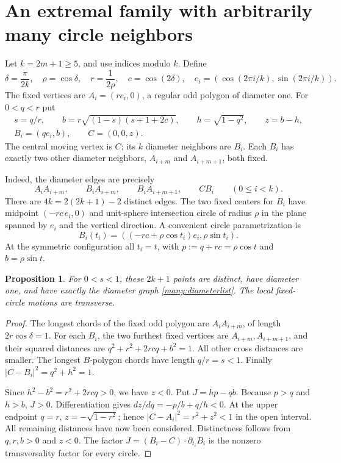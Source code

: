 \documentclass[11pt]{article}
\newtheorem{proposition}[theorem]{Proposition}
\theoremstyle{remark}\newtheorem{remark}[theorem]{Remark}
\begin{document}
\section{An extremal family with arbitrarily many circle neighbors}
Let $k=2m+1\geq5$, and use indices modulo $k$. Define
\[
 \delta=\frac{\pi}{2k},\quad \rho=\cos\delta,\quad
 r=\frac1{2\rho},\quad c=\cos(2\delta),\quad
 e_i=(\cos(2\pi i/k),\sin(2\pi i/k)).
\]
The fixed vertices are $A_i=(re_i,0)$, a regular odd polygon of
diameter one. For $0<q<r$ put
\begin{gather*}
 s=q/r,\qquad b=r\sqrt{(1-s)(s+1+2c)},\qquad
 h=\sqrt{1-q^2},\qquad z=b-h,\\
 B_i=(qe_i,b),\qquad C=(0,0,z).
\end{gather*}
The central moving vertex is $C$; its $k$ diameter neighbors are $B_i$.
Each $B_i$ has exactly two other diameter neighbors,
$A_{i+m}$ and $A_{i+m+1}$, both fixed.

Indeed, the diameter edges are precisely
\begin{equation}\label{many:diameterlist}
 A_iA_{i+m},\qquad B_iA_{i+m},\qquad
 B_iA_{i+m+1},\qquad CB_i\qquad(0\leq i<k).
\end{equation}
There are $4k=2(2k+1)-2$ distinct edges. The two fixed centers for
$B_i$ have midpoint $(-rc\,e_i,0)$ and unit-sphere intersection
circle of radius $\rho$ in the plane spanned by $e_i$ and the
vertical direction. A convenient circle parametrization is
\begin{equation}\label{many:circles}
 B_i(t_i)=((-rc+\rho\cos t_i)e_i,\rho\sin t_i).
\end{equation}
At the symmetric configuration all $t_i=t$, with
$p:=q+rc=\rho\cos t$ and $b=\rho\sin t$.

\begin{proposition}
For $0<s<1$, these $2k+1$ points are distinct, have diameter one,
and have exactly the diameter graph \eqref{many:diameterlist}. The local
fixed-circle motions are transverse.
\end{proposition}
\begin{proof}
The longest chords of the fixed odd polygon are $A_iA_{i+m}$, of
length $2r\cos\delta=1$. For each $B_i$, the two furthest fixed
vertices are $A_{i+m},A_{i+m+1}$, and their squared distances are
$q^2+r^2+2rcq+b^2=1$. All other cross distances are smaller.
The longest $B$-polygon chords have length $q/r=s<1$.
Finally $|C-B_i|^2=q^2+h^2=1$.

Since $h^2-b^2=r^2+2rcq>0$, we have $z<0$. Put
$J=hp-qb$. Because $p>q$ and $h>b$, $J>0$.
Differentiation gives $dz/dq=-p/b+q/h<0$.
At the upper endpoint $q=r$, $z=-\sqrt{1-r^2}$; hence
$|C-A_i|^2=r^2+z^2<1$ in the open interval.
All remaining distances have now been considered. Distinctness
follows from $q,r,b>0$ and $z<0$.
The factor $J=(B_i-C)\cdot\partial_{t_i}B_i$ is the nonzero
transversality factor for every circle.
\end{proof}
\end{document}
